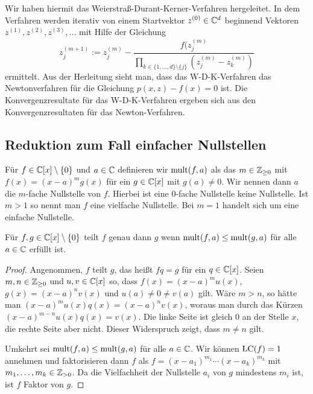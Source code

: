 \documentclass[11pt]{article}
\numberwithin{equation}{section}
\begin{document}
Wir haben hiermit das Weierstraß-Durant-Kerner-Verfahren hergeleitet. In dem Verfahren werden iterativ von einem Startvektor $z^{(0)} \in \mathbb{C}^d$ beginnend Vektoren $z^{(1)}, z^{(2)}, z^{(3)}, \ldots$ mit Hilfe der Gleichung 
\[
	z_j^{(m+1)} := z_j^{(m)} - \frac{f(z_j^{(m)}}{\prod_{k \in \{1,\ldots,d\} \setminus \{j\} } (z_j^{(m)} - z_k^{(m)} ) } 
\]
ermittelt. Aus der Herleitung sieht man, dass das W-D-K-Verfahren das Newtonverfahren für die Gleichung $p(x,z) - f(x)=0$ ist. Die Konvergenzresultate für das W-D-K-Verfahren ergeben sich aus den Konvergenzresultaten für das Newton-Verfahren. 

\subsection{Reduktion zum Fall einfacher Nullstellen} 

\begin{definition} 
	Für $f \in \mathbb{C}[x] \setminus \{ 0\}$ und $a \in \mathbb{C}$ definieren wir $\operatorname{mult}(f,a)$ als das $m \in \mathbb{Z}_{\ge 0}$ mit $f(x) = (x-a)^m g(x)$ für ein $g \in \mathbb{C}[x]$ mit $g(a) \ne 0$. Wir nennen dann $a$ die $m$-fache Nullstelle von $f$. Hierbei ist eine $0$-fache Nullstelle keine Nullstelle. Ist $m > 1$ so nennt man $f$ eine vielfache Nullstelle. Bei $m=1$ handelt sich um eine einfache Nullstelle. 
\end{definition} 


\begin{proposition} \label{divis:vs:mult}
	Für $f,g \in \mathbb{C}[x] \setminus \{0\}$ teilt $f$ genau dann $g$ wenn $\operatorname{mult}(f,a) \le \operatorname{mult}(g,a)$ für alle $a \in \mathbb{C}$ erfüllt ist.
\end{proposition} 
\begin{proof} 
	Angenommen, $f$ teilt $g$, das heißt $f q = g$ für ein $q \in \mathbb{C}[x]$. 
	Seien $m,n \in \mathbb{Z}_{\ge 0}$ und $u,v \in \mathbb{C}[x]$ so, dass $f(x) = (x-a)^m u(x)$, $g(x) = (x-a)^n v(x)$ und $u(a) \ne 0 \ne v(a)$ gilt. Wäre $m> n$, so hätte man $(x-a)^m u(x) q(x) = (x-a)^n v(x)$, woraus man durch das Kürzen $(x-a)^{m-n} u(x) q(x) = v(x)$. Die linke Seite ist gleich $0$ an der Stelle $x$, die rechte Seite aber nicht. Dieser Widerspruch zeigt, dass $m \ne n$ gilt. 
	
	Umkehrt sei $\operatorname{mult}(f,a) \le \operatorname{mult}(g,a)$ für alle $a \in \mathbb{C}$. Wir können $\operatorname{LC}(f) =1$ annehmen und faktorisieren dann $f$ als $f = (x-a_1)^{m_1} \cdots (x-a_k)^{m_k}$ mit $m_1,\ldots,m_k \in \mathbb{Z}_{> 0}$. Da die Vielfachheit der Nullstelle $a_i$ von $g$ mindestens $m_i$ ist, ist $f$ Faktor von $g$. 
\end{proof} 
\end{document}
